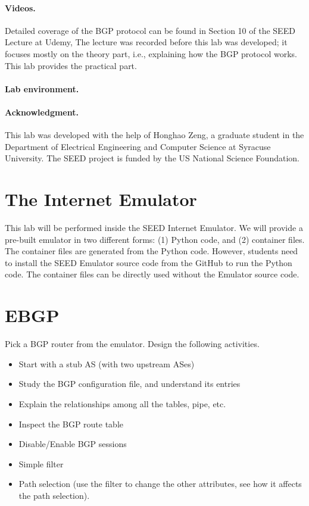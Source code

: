 \paragraph{Videos.}
Detailed coverage of the BGP protocol can be found in 
Section 10 of the SEED Lecture at Udemy, \seedisvideo 
The lecture was recorded before this lab was developed; 
it focuses mostly on the theory part, i.e., explaining how the BGP protocol works. 
This lab provides the practical part.  


\paragraph{Lab environment.} 
\seedenvironmentB
\nodependency


\paragraph{Acknowledgment.} 
This lab was developed with the help of Honghao Zeng, a graduate student
in the Department of Electrical Engineering and Computer Science at Syracuse University.
The SEED project is funded by the US National Science Foundation. 


\section{The Internet Emulator} 

This lab will be performed inside the SEED Internet Emulator. We will
provide a pre-built emulator in two different forms: (1) Python code,
and (2) container files. The container files are generated from
the Python code. However, students need to install the SEED Emulator source 
code from the GitHub to run the Python code. The container files
can be directly used without the Emulator source code. 


\section{EBGP} 

Pick a BGP router from the emulator. 
Design the following activities.

\begin{itemize}
  \item Start with a stub AS (with two upstream ASes)
  \item Study the BGP configuration file, and understand its entries
  \item Explain the relationships among all the tables, pipe, etc.
  \item Inspect the BGP route table 
  \item Disable/Enable BGP sessions
  \item Simple filter  
  \item Path selection (use the filter to change the other attributes,
    see how it affects the path selection).
\end{itemize}


